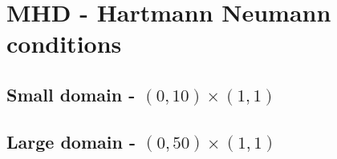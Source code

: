 \documentclass{article}
\begin{document}
\section*{MHD - Hartmann Neumann conditions}

\subsection*{Small domain - $(0,10)\times(1,1)$}


\subsection*{Large domain - $(0,50)\times(1,1)$}
\end{document}
